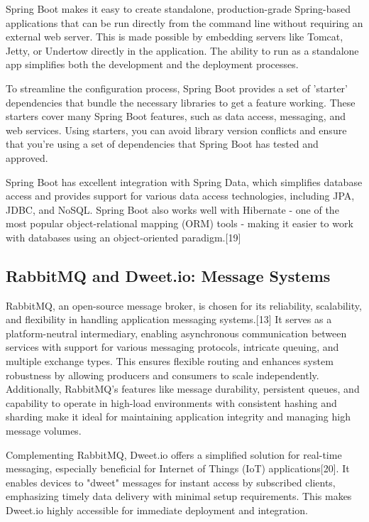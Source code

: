 Spring Boot makes it easy to create standalone, production-grade Spring-based applications that can be run directly from the command line without requiring an external web server. 
This is made possible by embedding servers like Tomcat, Jetty, or Undertow directly in the application. 
The ability to run as a standalone app simplifies both the development and the deployment processes.

To streamline the configuration process, Spring Boot provides a set of 'starter' dependencies that bundle the necessary libraries to get a feature working. 
These starters cover many Spring Boot features, such as data access, messaging, and web services. 
Using starters, you can avoid library version conflicts and ensure that you're using a set of dependencies that Spring Boot has tested and approved.

Spring Boot has excellent integration with Spring Data, which simplifies database access and provides support for various data access technologies, including JPA, JDBC, and NoSQL. 
Spring Boot also works well with Hibernate - one of the most popular object-relational mapping (ORM) tools - making it easier to work with databases using an object-oriented paradigm.[19]

\subsection{RabbitMQ and Dweet.io: Message Systems}

RabbitMQ, an open-source message broker, is chosen for its reliability, scalability, and flexibility in handling application messaging systems.[13] It serves as a platform-neutral intermediary, enabling asynchronous communication between services with support for various messaging protocols, intricate queuing, and multiple exchange types. This ensures flexible routing and enhances system robustness by allowing producers and consumers to scale independently. Additionally, RabbitMQ's features like message durability, persistent queues, and capability to operate in high-load environments with consistent hashing and sharding make it ideal for maintaining application integrity and managing high message volumes.

Complementing RabbitMQ, Dweet.io offers a simplified solution for real-time messaging, especially beneficial for Internet of Things (IoT) applications[20]. It enables devices to "dweet" messages for instant access by subscribed clients, emphasizing timely data delivery with minimal setup requirements. This makes Dweet.io highly accessible for immediate deployment and integration.


